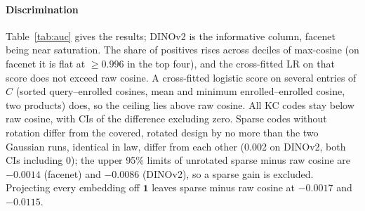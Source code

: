 \documentclass[preprint,12pt,authoryear]{elsarticle}
\theoremstyle{remark}
\begin{document}
\paragraph{Discrimination} Table~\ref{tab:auc} gives the results; DINOv2 is the informative column, facenet being
near saturation. The share of positives rises across deciles of max-cosine (on facenet it is flat at $\ge0.996$ in
the top four), and the cross-fitted LR on that score does not exceed raw cosine. A cross-fitted logistic score on
several entries of $C$ (sorted query--enrolled cosines, mean and minimum enrolled--enrolled cosine, two products)
does, so the ceiling lies above raw cosine. All KC codes stay below raw cosine, with CIs of the difference
excluding zero. Sparse codes without rotation differ from the covered, rotated design by no more than the two
Gaussian runs, identical in law, differ from each other (0.002 on DINOv2, both CIs including 0); the upper 95\%
limits of unrotated sparse minus raw cosine are $-0.0014$ (facenet) and $-0.0086$ (DINOv2), so a sparse gain is
excluded. Projecting every embedding off $\mathbf 1$ leaves sparse minus raw cosine at $-0.0017$ and $-0.0115$.
\end{document}
